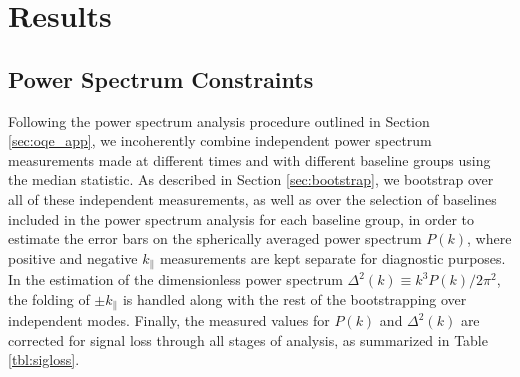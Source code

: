 \documentclass[twocolumn,numberedappendix]{emulateapj} \shorttitle{PSA64}
\begin{document}
%




\section{Results}\label{sec:results}

\subsection{Power Spectrum Constraints}

Following the power spectrum analysis procedure outlined in Section \ref{sec:oqe_app},
we incoherently combine independent power spectrum measurements made at different
times and with different baseline groups using the median statistic.  As described
in Section \ref{sec:bootstrap}, we bootstrap over all of these independent measurements,
as well as over the selection of baselines included in the power spectrum analysis for
each baseline group, in order to estimate the error bars on the spherically averaged
power spectrum $P(k)$, where positive and negative $k_\parallel$ measurements
are kept separate for diagnostic purposes.  In the estimation of the 
dimensionless power spectrum
$\Delta^{2}(k)\equiv{k^{3}P(k)}/{2\pi^{2}}$, the folding of $\pm k_\parallel$ is
handled along with the rest of the bootstrapping over independent modes.
Finally, the measured values for $P(k)$ and $\Delta^2(k)$ are corrected for signal
loss through all stages of analysis, as summarized in Table \ref{tbl:sigloss}.
\end{document}
